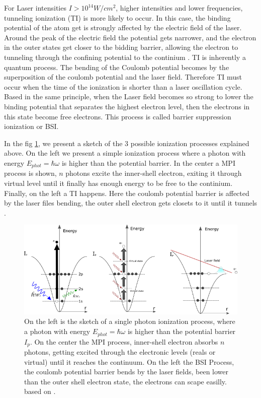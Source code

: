 For Laser intensities $I > 10^{14}W/cm^{2}$, higher intensities and lower frequencies, tunneling ionization (TI) is more likely to occur.  In this case, the binding potential of the atom get is strongly affected by the electric field of the laser. Around the peak of the electric field the  potential gets narrower, and the electron in the outer states get closer to the bidding barrier, allowing the electron to tunneling through the confining potential to the continium  \cite{griffiths_introduction_2013}. TI is inherently a quantum process. The bending of the Coulomb potential becomes by the superposition of the coulomb potential and the laser field. Therefore TI must occur when the time of the ionization is shorter than a laser oscillation cycle\cite{berkowitz_photoabsorption_1979}. Based in the same principle, when the Laser field becomes so strong to lower the binding potential that separates the highest electron level, then the electrons in this state become free electrons. This process is called barrier suppression ionization or BSI\cite{krishnan_doped_2011}.

In the fig \ref{img:ionizationprocess}, we present a sketch of the 3 possible ionization processes explained above. On the left we present a simple ionization process where a photon with energy $E_{phot} = \hbar\omega$ is higher than the potential barrier. In the center a MPI process is shown, $n$ photons excite the inner-shell electron, exiting it through virtual level until it finally has enough energy to be free to the continium. Finally, on the left a TI happens. Here the coulomb potential barrier is affected by the laser files bending, the outer shell electron  gets closets to it until it tunnels \cite{rafipoor_two-color_2017}.

\begin{figure}[hbtp]
\label{img:ionizationprocess}
\centering
\includegraphics[width = 8 cm]{../Images/photoionization2.png}
\caption[Ionization regimes]{ On the left is the sketch of a single photon ionization process, where a photon with energy $E_{phot} = \hbar\omega$ is higher than the potential barrier $I_{p}$. On the center the MPI process,  inner-shell electron absorbs $n$ photons, getting excited through the electronic levels (reals or virtual)  until it reaches the continuum. On the left the BSI Process, the coulomb potential barrier bends by the laser fields, been lower than the outer shell electron state, the electrons can scape easilly. based on \cite{rafipoor_two-color_2017}.}
\end{figure}


